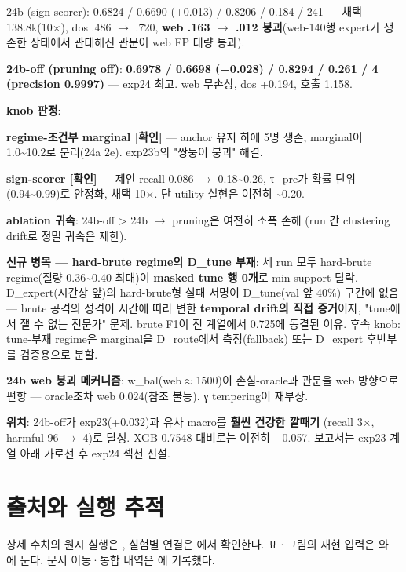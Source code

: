 \par\noindent \textbullet\enspace 24b (sign-scorer): 0.6824 /\allowbreak{} 0.6690 (+\allowbreak{}0.013) /\allowbreak{} 0.8206 /\allowbreak{} 0.184 /\allowbreak{} 241 — 채택 138.8k(10×), dos .486 \ensuremath{\rightarrow} .720, \textbf{web .163 \ensuremath{\rightarrow} .012 붕괴}(web-140행 expert가 생존한 상태에서 관대해진 관문이 web FP 대량 통과).


\par\noindent \textbullet\enspace \textbf{24b-off (pruning off)}: \textbf{0.6978 /\allowbreak{} 0.6698 (+\allowbreak{}0.028) /\allowbreak{} 0.8294 /\allowbreak{} 0.261 /\allowbreak{} 4 (precision 0.9997)} — exp24 최고. web 무손상, dos +\allowbreak{}0.194, 호출 1.158.


\textbf{knob 판정}:

\par\noindent \textbullet\enspace \textbf{regime-조건부 marginal [확인]} — anchor 유지 하에 5명 생존, marginal이 1.0\textasciitilde{}10.2로 분리(24a 2e). exp23b의 "쌍둥이 붕괴" 해결.


\par\noindent \textbullet\enspace \textbf{sign-scorer [확인]} — 제안 recall 0.086 \ensuremath{\rightarrow} 0.18\textasciitilde{}0.26, τ\_\allowbreak{}pre가 확률 단위 (0.94\textasciitilde{}0.99)로 안정화, 채택 10×. 단 utility 실현은 여전히 \textasciitilde{}0.20.


\par\noindent \textbullet\enspace \textbf{ablation 귀속}: 24b-off > 24b  \ensuremath{\rightarrow}  pruning은 여전히 소폭 손해 (run 간 clustering drift로 정밀 귀속은 제한).


\textbf{신규 병목 — hard-brute regime의 D\_\allowbreak{}tune 부재}: 세 run 모두 hard-brute regime(질량 0.36\textasciitilde{}0.40 최대)이 \textbf{masked tune 행 0개}로 min-support 탈락. D\_\allowbreak{}expert(시간상 앞)의 hard-brute형 실패 서명이 D\_\allowbreak{}tune(val 앞 40\%) 구간에 없음 — brute 공격의 성격이 시간에 따라 변한 \textbf{temporal drift의 직접 증거}이자, "tune에서 잴 수 없는 전문가" 문제. brute F1이 전 계열에서 0.725에 동결된 이유. 후속 knob: tune-부재 regime은 marginal을 D\_\allowbreak{}route에서 측정(fallback) 또는 D\_\allowbreak{}expert 후반부를 검증용으로 분할.

\textbf{24b web 붕괴 메커니즘}: w\_\allowbreak{}bal(web\ensuremath{\approx}1500)이 손실-oracle과 관문을 web 방향으로 편향 — oracle조차 web 0.024(참조 불능). γ tempering이 재부상.

\textbf{위치}: 24b-off가 exp23(+\allowbreak{}0.032)과 유사 macro를 \textbf{훨씬 건강한 깔때기} (recall 3×, harmful 96 \ensuremath{\rightarrow} 4)로 달성. XGB 0.7548 대비로는 여전히 −0.057. 보고서는 exp23 계열 아래 가로선 후 exp24 섹션 신설.



\section*{출처와 실행 추적}

상세 수치의 원시 실행은 , 실험별 연결은 에서 확인한다. 표·그림의 재현 입력은 와 에 둔다. 문서 이동·통합 내역은 에 기록했다.


